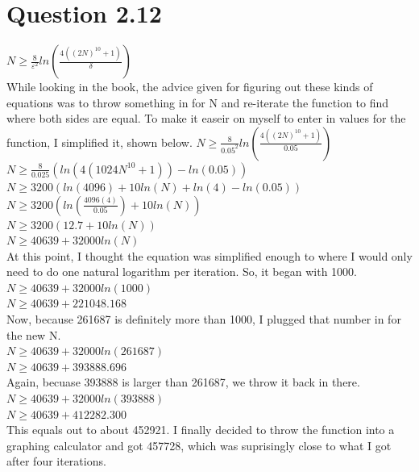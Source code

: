 \documentclass[a4paper]{article}
\begin{document}
\section{Question 2.12}
$N\geq\frac{8}{\varepsilon^2}ln(\frac{4((2N)^{10}+1)}{\delta})$\\
While looking in the book, the advice given for figuring out these kinds of equations was to throw something in for N and re-iterate the function to find where both sides are equal. To make it easeir on myself to enter in values for the function, I simplified it, shown below.
$N\geq\frac{8}{0.05^2}ln(\frac{4((2N)^{10}+1)}{0.05})$\\
$N\geq\frac{8}{0.025}(ln(4(1024N^{10}+1))-ln(0.05))$\\
$N\geq3200(ln(4096)+10ln(N)+ln(4)-ln(0.05))$\\
$N\geq3200(ln(\frac{4096(4)}{0.05})+10ln(N))$\\
$N\geq3200(12.7+10ln(N))$\\
$N\geq40639+32000ln(N)$\\
At this point, I thought the equation was simplified enough to where I would only need to do one natural logarithm per iteration. So, it began with 1000.\\
$N\geq40639+32000ln(1000)$\\
$N\geq40639+221048.168$\\
Now, because 261687 is definitely more than 1000, I plugged that number in for the new N.\\
$N\geq40639+32000ln(261687)$\\
$N\geq40639+393888.696$\\
Again, becuase 393888 is larger than 261687, we throw it back in there.\\
$N\geq40639+32000ln(393888)$\\
$N\geq40639+412282.300$\\
This equals out to about 452921. I finally decided to throw the function into a graphing calculator and got 457728, which was suprisingly close to what I got after four iterations. 
\end{document}
